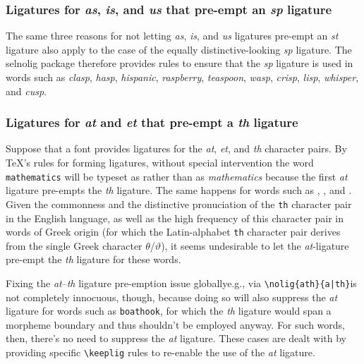 \documentclass[11pt]{article}
\newcommand{\pkg}[1]{\textsf{#1}}
\newcommand{\opt}[1]{\texttt{#1}}
\newcommand{\cmmd}[1]{\texttt{\textbackslash #1}}
\begin{document}
\subsubsection*{Ligatures for \emph{as}, \emph{is}, and \emph{us} that pre-empt an \emph{sp} ligature}

The same three reasons for not letting \emph{as}, \emph{is}, and \emph{us} ligatures pre-empt an \emph{st} ligature also apply to the case of the equally distinctive-looking \emph{sp} ligature. The \pkg{selnolig} package therefore provides rules to ensure that the \emph{sp} ligature is used in words such as \emph{clasp}, \emph{hasp}, \emph{hispanic}, \emph{raspberry}, \emph{teaspoon}, \emph{wasp}, \emph{crisp}, \emph{lisp}, \emph{whisper}, and \emph{cusp}. 



\subsubsection*{Ligatures for \emph{at} and \emph{et} that pre-empt a \emph{th} ligature}

Suppose that a font provides ligatures for the \emph{at}, \emph{et}, and \emph{th} character pairs. By \TeX's rules for forming ligatures, without special intervention the word \opt{mathematics} will be typeset as \emph{} rather than as \emph{mathematics} because the first \emph{at} ligature pre-empts the \emph{th} ligature. The same happens for words such as \emph{}, \emph{}, and \emph{}.
Given the commonness and the distinctive pronuciation of the \opt{th} character pair in the English language, as well as the high frequency of this character pair in words of Greek origin (for which the Latin-alphabet \opt{th} character pair derives from the single Greek character $\theta$/$\vartheta$), it seems undesirable to let the \emph{at}-ligature pre-empt the \emph{th} ligature for these words. 

Fixing the \emph{at}--\emph{th} ligature pre-emption issue globally\textemdash e.g., via \Verb+\nolig{ath}{a|th}+\textemdash is not completely innocuous, though, because doing so will also suppress the \emph{at} ligature for words such as \opt{boathook}, for which the \emph{th} ligature would span a morpheme boundary and thus shouldn't be employed anyway. For such words, then, there's no need to suppress the \emph{at} ligature. These cases are dealt with by providing specific \cmmd{keeplig} rules to re-enable the use of the \emph{at} ligature.
\end{document}

